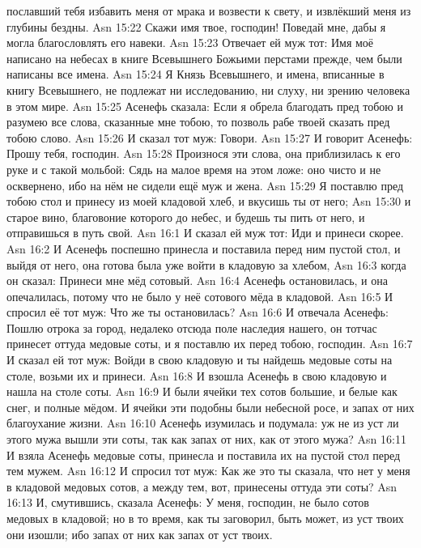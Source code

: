 пославший тебя избавить меня от мрака и возвести к свету, и
извлёкший меня из глубины бездны.
\vs Asn 15:22
Скажи имя твое, господин!
Поведай мне, дабы я могла благословлять его навеки.
\vs Asn 15:23
Отвечает ей муж тот:
Имя моё написано на небесах в книге
Всевышнего Божьими перстами прежде,
чем были написаны все имена.
\vs Asn 15:24
Я Князь Всевышнего,
и имена, вписанные в книгу Всевышнего,
не подлежат ни исследованию, ни слуху, ни
зрению человека в этом мире.
\vs Asn 15:25
Асенефь сказала: Если я
обрела благодать пред тобою и разумею все слова, сказанные мне тобою, то
позволь рабе твоей сказать пред тобою слово.
\vs Asn 15:26
И сказал тот муж: Говори.
\vs Asn 15:27
И говорит Асенефь: Прошу тебя, господин.
\vs Asn 15:28
Произнося эти слова, она приблизилась к его руке
и с такой мольбой: Сядь на малое время на этом ложе:
оно чисто и не осквернено, ибо на нём не сидели ещё муж и жена.
\vs Asn 15:29
Я поставлю пред тобою стол
и принесу из моей кладовой хлеб, и вкусишь ты от него;
\vs Asn 15:30
и старое вино, благовоние
которого до небес, и будешь ты пить от него,
и отправишься в путь свой.
\vs Asn 16:1
И сказал ей муж тот: Иди и принеси скорее.
\vs Asn 16:2
И Асенефь поспешно принесла
и поставила перед ним пустой стол,
и выйдя от него, она готова была уже войти в
кладовую за хлебом,
\vs Asn 16:3
когда он сказал: Принеси мне мёд сотовый.
\vs Asn 16:4
Асенефь остановилась, и она опечалилась,
потому что не было у неё сотового мёда в кладовой.
\vs Asn 16:5
И спросил её тот муж: Что же ты остановилась?
\vs Asn 16:6
И отвечала Асенефь: Пошлю отрока за город,
недалеко отсюда поле наследия нашего, он тотчас принесет оттуда
медовые соты, и я поставлю их перед тобою, господин.
\vs Asn 16:7
И сказал ей тот муж: Войди в свою кладовую
и ты найдешь медовые соты на столе, возьми их и принеси.
\vs Asn 16:8
И взошла Асенефь в свою кладовую и нашла на столе соты.
\vs Asn 16:9
И были ячейки тех сотов большие,
и белые как снег, и полные мёдом.
И ячейки эти подобны были небесной
росе, и запах от них благоухание жизни.
\vs Asn 16:10
Асенефь изумилась и подумала:
уж не из уст ли этого мужа вышли эти соты,
так как запах от них, как от этого мужа?
\vs Asn 16:11
И взяла Асенефь медовые соты,
принесла и поставила их на пустой стол перед тем мужем.
\vs Asn 16:12
И спросил тот муж: Как же это ты сказала,
что нет у меня в кладовой медовых сотов, а между тем,
вот, принесены оттуда эти соты?
\vs Asn 16:13
И, смутившись, сказала Асенефь:
У меня, господин, не было сотов медовых в кладовой; но в то время,
как ты заговорил, быть может, из уст твоих они изошли;
ибо запах от них как запах от уст твоих.
